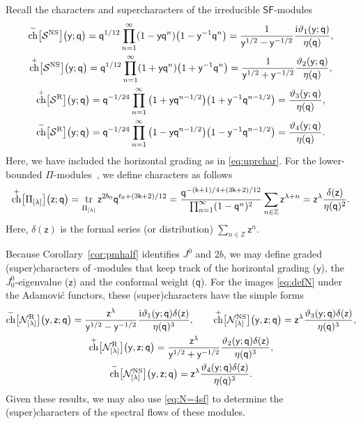 \documentclass[pdftex]{sigma}
\numberwithin{equation}{section}
\newcommand{\ii}{\mathrm{i}} %
\newcommand{\kk}{\mathsf{k}} %
\newcommand{\qq}{\mathsf{q}} %
\newcommand{\yy}{\mathsf{y}} %
\newcommand{\zz}{\mathsf{z}} %
\newcommand{\NS}{\textnormal{NS}}
\newcommand{\R}{\textnormal{R}}
\DeclarePairedDelimiter{\brac}{\lparen}{\rparen} %
\DeclarePairedDelimiter{\sqbrac}{\lbrack}{\rbrack} %
\newcommand{\fld}[1]{\mathbb{#1}} %
\newcommand{\VOA}[1]{\mathsf{#1}} %
\newcommand{\Mod}[1]{\mathcal{#1}} %
\newcommand{\ZZ}{\fld{Z}}
\newcommand{\sfsymb}{\VOA{SF}}
\newcommand{\lsymb}{\Pi}
\newcommand{\sfvoa}{\sfsymb} %
\newcommand{\lvoa}{\lsymb} %
\newcommand{\swalg}[2]{\VOA{W}_{#1}^{\mathrm{#2}}} %
\newcommand{\smin}[1][\kk]{\swalg{#1}{min}} %
\newcommand{\sminpmhalf}{\smin[\pm 1/2]}
\newcommand{\lmod}[1]{\lsymb_{[#1]}} %
\newcommand{\sfnsmod}{\Mod{S}^{\NS}} %
\newcommand{\sfrmod}{\Mod{S}^{\R}} %
\newcommand{\nnsind}[1]{\Mod{N}^{\NS}_{[#1]}} %
\newcommand{\nrind}[1]{\Mod{N}^{\R}_{[#1]}}
\DeclareMathOperator{\tr}{tr}
\newcommand{\traceover}[1]{\tr_{\raisebox{-2pt}{$\scriptstyle #1$}}} %
\newcommand{\Gr}[1]{\sqbrac[\big]{#1}} %
\DeclareMathOperator{\chmap}{ch}
\newcommand{\ch}[1]{\chmap^+ \Gr{#1}} %
\newcommand{\fch}[2]{\ch{#1} \brac[\big]{#2}} %
\newcommand{\sch}[1]{\chmap^- \Gr{#1}} %
\newcommand{\fsch}[2]{\sch{#1} \brac[\big]{#2}}
\begin{document}
Recall the characters and supercharacters of the irreducible $\sfvoa$-modules
\begin{gather*}
 \fsch{\sfnsmod}{\yy;\qq} = \qq^{1/12} \prod_{n=1}^{\infty} (1-\yy\qq^n)\big(1-\yy^{-1}\qq^n\big)
 = \frac{1}{\yy^{1/2}-\yy^{-1/2}} \frac{\ii \vartheta_{1}(\yy;\qq)}{\eta(\qq)}, \\
 \fch{\sfnsmod}{\yy;\qq} = \qq^{1/12} \prod_{n=1}^{\infty} (1+\yy\qq^n)\big(1+\yy^{-1}\qq^n\big)
 = \frac{1}{\yy^{1/2}+\yy^{-1/2}} \frac{\vartheta_{2}(\yy;\qq)}{\eta(\qq)}, \\
 \fch{\sfrmod}{\yy;\qq} = \qq^{-1/24} \prod_{n=1}^{\infty} \big(1+\yy\qq^{n-1/2}\big)\big(1+\yy^{-1}\qq^{n-1/2}\big)
 = \frac{\vartheta_{3}(\yy;\qq)}{\eta(\qq)}, \\
 \fsch{\sfrmod}{\yy;\qq} = \qq^{-1/24} \prod_{n=1}^{\infty} \big(1-\yy\qq^{n-1/2}\big)\big(1-\yy^{-1}\qq^{n-1/2}\big)
 = \frac{\vartheta_{4}(\yy;\qq)}{\eta(\qq)}.
\end{gather*}
Here, we have included the horizontal grading as in \eqref{eq:uprchar}.
For the lower-bounded $\lvoa$-modules~\smash{$\lmod{\lambda}$}, we define characters as follows
\[
	\fch{\lmod{\lambda}}{\zz;\qq}
	= \traceover{\lmod{\lambda}} \zz^{2b_0} \qq^{t_{0} + (3\kk+2)/12}
	= \frac{\qq^{-(\kk+1)/4 + (3\kk+2)/12}}{\prod_{n=1}^{\infty} (1-\qq^n)^2} \sum_{n \in \ZZ} \zz^{\lambda+n}
	= \zz^{\lambda} \frac{\delta(\zz)}{\eta(\qq)^2}.
\]
Here, $\delta(\zz)$ is the formal series (or distribution) $\sum_{n\in\ZZ} \zz^n$.

Because Corollary~\ref{cor:pmhalf} identifies $J^0$ and $2b$, we may define graded (super)characters of \smash{$\sminpmhalf$}-modules that keep track of the horizontal grading ($\yy$), the $J^0_0$-eigenvalue ($\zz$) and the conformal weight ($\qq$).
For the images \eqref{eq:defN} under the Adamovi\'{c} functors, these (super)characters have the simple forms
\begin{gather}
		\fsch{\nrind{\lambda}}{\yy,\zz;\qq} = \frac{\zz^{\lambda}}{\yy^{1/2}-\yy^{-1/2}} \frac{\ii \vartheta_{1}(\yy;\qq) \delta(\zz)}{\eta(\qq)^3}, \qquad
		\fch{\nnsind{\lambda}}{\yy,\zz;\qq} = \zz^{\lambda} \frac{\vartheta_{3}(\yy;\qq) \delta(\zz)}{\eta(\qq)^3},\nonumber \\
		\fch{\nrind{\lambda}}{\yy,\zz;\qq} = \frac{\zz^{\lambda}}{\yy^{1/2}+\yy^{-1/2}} \frac{\vartheta_{2}(\yy;\qq) \delta(\zz)}{\eta(\qq)^3}, \nonumber \\
		\fsch{\nnsind{\lambda}}{\yy,\zz;\qq} = \zz^{\lambda} \frac{\vartheta_{4}(\yy;\qq) \delta(\zz)}{\eta(\qq)^3}. \label{eq:N=4(s)ch}
\end{gather}
Given these results, we may also use \eqref{eq:N=4sf} to determine the (super)characters of the spectral flows of these modules.
\end{document}
